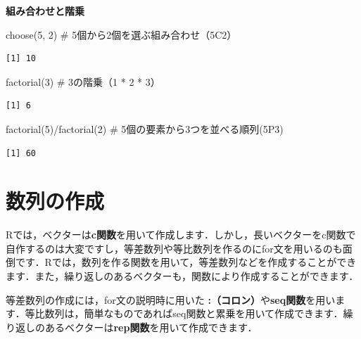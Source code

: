 \documentclass[
  letterpaper,
  DIV=11,
  numbers=noendperiod]{scrreprt}
\newenvironment{Shaded}{\begin{snugshade}}{\end{snugshade}}
\newcommand{\CommentTok}[1]{\textcolor[rgb]{0.37,0.37,0.37}{#1}}
\newcommand{\DecValTok}[1]{\textcolor[rgb]{0.68,0.00,0.00}{#1}}
\newcommand{\FunctionTok}[1]{\textcolor[rgb]{0.28,0.35,0.67}{#1}}
\newcommand{\NormalTok}[1]{\textcolor[rgb]{0.00,0.23,0.31}{#1}}
\newcommand{\SpecialCharTok}[1]{\textcolor[rgb]{0.37,0.37,0.37}{#1}}
\begin{document}
\textbf{組み合わせと階乗}

\begin{Shaded}
\begin{Highlighting}[]
\FunctionTok{choose}\NormalTok{(}\DecValTok{5}\NormalTok{, }\DecValTok{2}\NormalTok{) }\CommentTok{\# 5個から2個を選ぶ組み合わせ（5C2）}
\end{Highlighting}
\end{Shaded}

\begin{verbatim}
[1] 10
\end{verbatim}

\begin{Shaded}
\begin{Highlighting}[]
\FunctionTok{factorial}\NormalTok{(}\DecValTok{3}\NormalTok{) }\CommentTok{\# 3の階乗（1 * 2 * 3）}
\end{Highlighting}
\end{Shaded}

\begin{verbatim}
[1] 6
\end{verbatim}

\begin{Shaded}
\begin{Highlighting}[]
\FunctionTok{factorial}\NormalTok{(}\DecValTok{5}\NormalTok{)}\SpecialCharTok{/}\FunctionTok{factorial}\NormalTok{(}\DecValTok{2}\NormalTok{) }\CommentTok{\# 5個の要素から3つを並べる順列(5P3)}
\end{Highlighting}
\end{Shaded}

\begin{verbatim}
[1] 60
\end{verbatim}

\hypertarget{ux6570ux5217ux306eux4f5cux6210}{%
\section{数列の作成}\label{ux6570ux5217ux306eux4f5cux6210}}

Rでは，ベクターは\textbf{c関数}を用いて作成します．しかし，長いベクターをc関数で自作するのは大変ですし，等差数列や等比数列を作るのにfor文を用いるのも面倒です．Rでは，数列を作る関数を用いて，等差数列などを作成することができます．また，繰り返しのあるベクターも，関数により作成することができます．

等差数列の作成には，for文の説明時に用いた
\textbf{:（コロン）}や\textbf{seq関数}を用います．等比数列は，簡単なものであればseq関数と累乗を用いて作成できます．繰り返しのあるベクターは\textbf{rep関数}を用いて作成できます．
\end{document}

